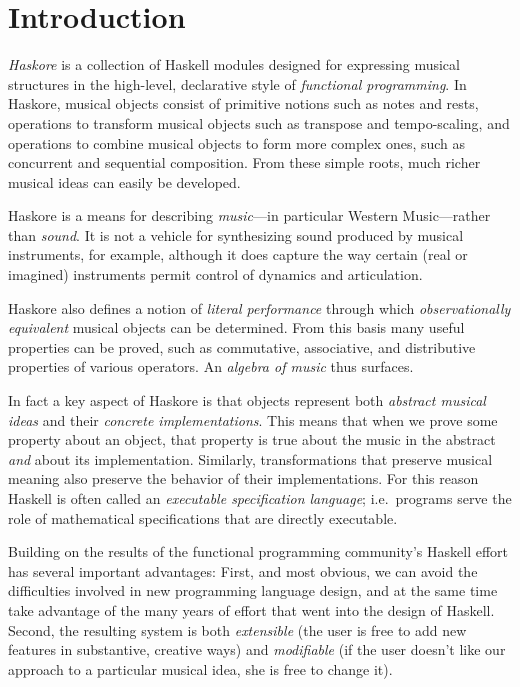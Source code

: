 \section{Introduction}
\label{intro}

{\em Haskore} is a collection of Haskell modules designed for
expressing musical structures in the high-level, declarative style of
{\em functional programming}.  In Haskore, musical objects consist of
primitive notions such as notes and rests, operations to transform
musical objects such as transpose and tempo-scaling, and operations to
combine musical objects to form more complex ones, such as concurrent
and sequential composition.  From these simple roots, much richer
musical ideas can easily be developed.

Haskore is a means for describing {\em music}---in particular Western
Music---rather than {\em sound}.  It is not a vehicle for synthesizing
sound produced by musical instruments, for example, although it does
capture the way certain (real or imagined) instruments permit control
of dynamics and articulation.

Haskore also defines a notion of {\em literal performance} through
which {\em observationally equivalent} musical objects can be
determined.  From this basis many useful properties can be proved,
such as commutative, associative, and distributive properties of
various operators.  An {\em algebra of music} thus surfaces.

In fact a key aspect of Haskore is that objects represent both {\em
abstract musical ideas} and their {\em concrete implementations}.
This means that when we prove some property about an object, that
property is true about the music in the abstract {\em and} about its
implementation.  Similarly, transformations that preserve musical
meaning also preserve the behavior of their implementations.  For this
reason Haskell is often called an {\em executable specification
language}; i.e.~programs serve the role of mathematical specifications
that are directly executable.

Building on the results of the functional programming community's
Haskell effort has several important advantages: First, and most
obvious, we can avoid the difficulties involved in new programming
language design, and at the same time take advantage of the many years
of effort that went into the design of Haskell.  Second, the resulting
system is both {\em extensible} (the user is free to add new features
in substantive, creative ways) and {\em modifiable} (if the user
doesn't like our approach to a particular musical idea, she is free to
change it).

